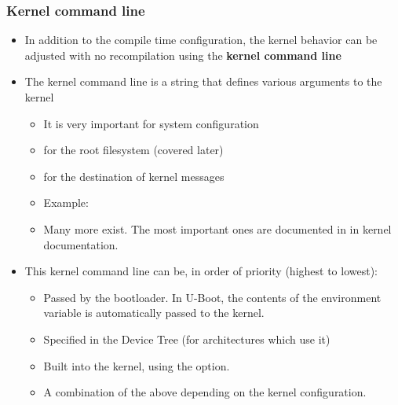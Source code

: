 \begin{frame}
  \frametitle{Kernel command line}
  \begin{itemize}
  \item In addition to the compile time configuration, the kernel
    behavior can be adjusted with no recompilation using the {\bf
      kernel command line}
  \item The kernel command line is a string that defines various
    arguments to the kernel
    \begin{itemize}
    \item It is very important for system configuration
    \item {} for the root filesystem (covered later)
    \item {} for the destination of kernel messages
    \item Example: 
    \item Many more exist. The most important ones are documented
          in  in kernel
          documentation.
    \end{itemize}
  \item This kernel command line can be, in order of priority (highest
    to lowest):
    \begin{itemize}
    \item Passed by the bootloader. In U-Boot, the contents of the
       environment variable is automatically passed to the
      kernel.
    \item Specified in the Device Tree (for architectures which use it)
    \item Built into the kernel, using the  option.
    \item A combination of the above depending on the kernel configuration.
    \end{itemize}
  \end{itemize}
\end{frame}
